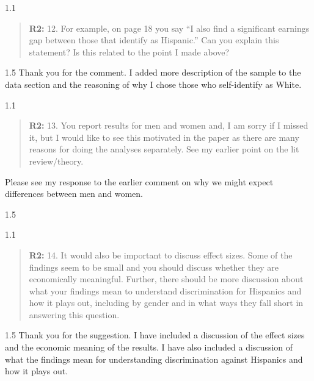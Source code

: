 \documentclass[12pt,english]{article}
\newcommand{\rrquote}{1.1}
\newcommand{\rrxspc}{1.5}
\begin{document}
\begin{refsection}
    \begin{spacing}{\rrquote}
        \begin{quotation}
        \textbf{R2: } 12. For example, on page 18 you say “I also find a significant earnings gap between those that identify as Hispanic.” Can you explain this statement? Is this related to the point I made above?

        \end{quotation}
        \end{spacing}
        
        \begin{spacing}{\rrxspc}
            Thank you for the comment. I added more description of the sample to the data section and the reasoning of why I chose those who self-identify as White. 
    \end{spacing}

    \begin{spacing}{\rrquote}
        \begin{quotation}
        \textbf{R2: } 13. You report results for men and women and, I am sorry if I missed it, but I would like to see this motivated in the paper as there are many reasons for doing the analyses separately. See my earlier point on the lit review/theory.
              
        \end{quotation}
        \end{spacing}
            Please see my response to the earlier comment on why we might expect differences between men and women.
        \begin{spacing}{\rrxspc}
            
    \end{spacing}

    \begin{spacing}{\rrquote}
        \begin{quotation}
        \textbf{R2: } 14. It would also be important to discuss effect sizes. Some of the findings seem to be small and you should discuss whether they are economically meaningful. Further, there should be more discussion about what your findings mean to understand discrimination for Hispanics and how it plays out, including by gender and in what ways they fall short in answering this question.
              
        \end{quotation}
        \end{spacing}
        
        \begin{spacing}{\rrxspc}
            Thank you for the suggestion. I have included a discussion of the effect sizes and the economic meaning of the results. I have also included a discussion of what the findings mean for understanding discrimination against Hispanics and how it plays out.
    \end{spacing}


\end{refsection}
\end{document}
